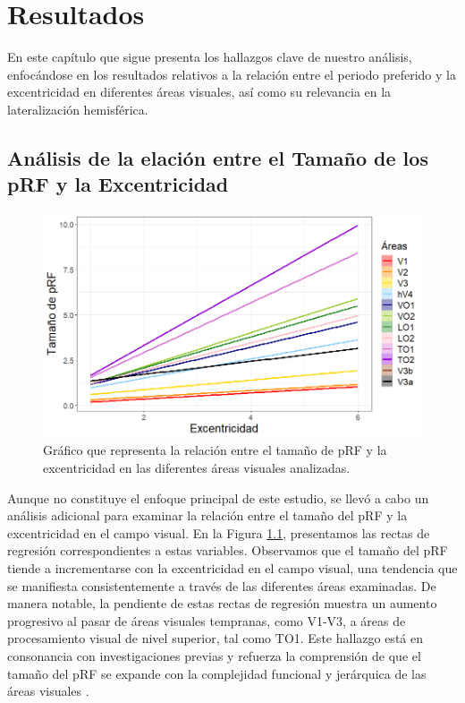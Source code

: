 \chapter{Resultados}\label{chapter:results}

En este cap\'itulo que sigue presenta los hallazgos clave de nuestro análisis, enfocándose en los resultados relativos a la relación entre el periodo preferido y la excentricidad en diferentes áreas visuales, así como su relevancia en la lateralización hemisférica.

\section{Análisis de la elación entre el Tamaño de los pRF y la Excentricidad}

\begin{figure}[h]
	\centering
	\includegraphics[scale=0.6]{Graphics/size_vs_eccen_bayesian}
	\caption{Gráfico que representa la relación entre el tama\~no de pRF y la excentricidad en las diferentes áreas visuales analizadas.}
	\label{fig:sigma_vs_eccen}
\end{figure}

Aunque no constituye el enfoque principal de este estudio, se llevó a cabo un análisis adicional para examinar la relación entre el tamaño del pRF y la excentricidad en el campo visual. En la Figura \ref{fig:sigma_vs_eccen}, presentamos las rectas de regresión correspondientes a estas variables. Observamos que el tamaño del pRF tiende a incrementarse con la excentricidad en el campo visual, una tendencia que se manifiesta consistentemente a través de las diferentes áreas examinadas. De manera notable, la pendiente de estas rectas de regresión muestra un aumento progresivo al pasar de áreas visuales tempranas, como V1-V3, a áreas de procesamiento visual de nivel superior, tal como TO1. Este hallazgo está en consonancia con investigaciones previas y refuerza la comprensión de que el tamaño del pRF se expande con la complejidad funcional y jerárquica de las áreas visuales .

